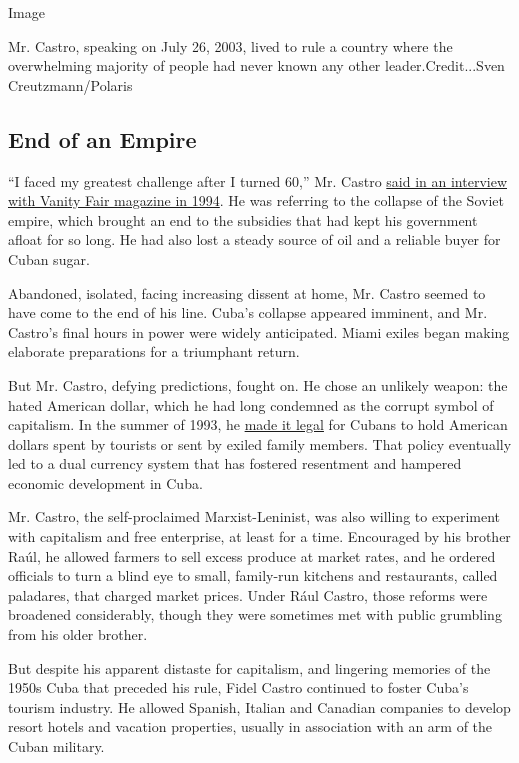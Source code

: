Image

Mr. Castro, speaking on July 26, 2003, lived to rule a country where the
overwhelming majority of people had never known any other
leader.Credit...Sven Creutzmann/Polaris

\hypertarget{end-of-an-empire}{%
\subsection{End of an Empire}\label{end-of-an-empire}}

``I faced my greatest challenge after I turned 60,'' Mr. Castro
\href{http://www.vanityfair.com/news/1994/03/fidel-castro-exclusive-interview}{said
in an interview with Vanity Fair magazine in 1994}. He was referring to
the collapse of the Soviet empire, which brought an end to the subsidies
that had kept his government afloat for so long. He had also lost a
steady source of oil and a reliable buyer for Cuban sugar.

Abandoned, isolated, facing increasing dissent at home, Mr. Castro
seemed to have come to the end of his line. Cuba's collapse appeared
imminent, and Mr. Castro's final hours in power were widely anticipated.
Miami exiles began making elaborate preparations for a triumphant
return.

But Mr. Castro, defying predictions, fought on. He chose an unlikely
weapon: the hated American dollar, which he had long condemned as the
corrupt symbol of capitalism. In the summer of 1993, he
\href{http://www.nytimes.com/1993/08/16/business/cuba-s-new-money-law.html}{made
it legal} for Cubans to hold American dollars spent by tourists or sent
by exiled family members. That policy eventually led to a dual currency
system that has fostered resentment and hampered economic development in
Cuba.

Mr. Castro, the self-proclaimed Marxist-Leninist, was also willing to
experiment with capitalism and free enterprise, at least for a time.
Encouraged by his brother Raúl, he allowed farmers to sell excess
produce at market rates, and he ordered officials to turn a blind eye to
small, family-run kitchens and restaurants, called paladares, that
charged market prices. Under Rául Castro, those reforms were broadened
considerably, though they were sometimes met with public grumbling from
his older brother.

But despite his apparent distaste for capitalism, and lingering memories
of the 1950s Cuba that preceded his rule, Fidel Castro continued to
foster Cuba's tourism industry. He allowed Spanish, Italian and Canadian
companies to develop resort hotels and vacation properties, usually in
association with an arm of the Cuban military.

